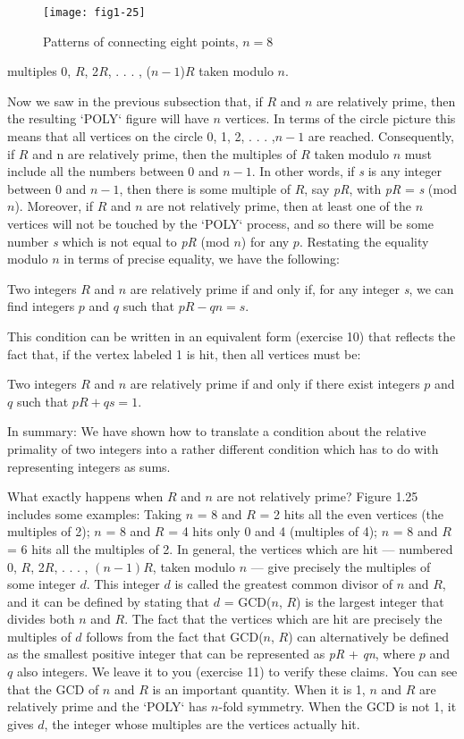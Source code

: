 \documentclass{book}
\begin{document}
\begin{figure}
\begin{center}
\texttt{[image: fig1-25]}
\caption{Patterns of connecting eight points, $n = 8$}
\end{center}
\end{figure}


multiples 0, $R$, 2$R$, . . . , ($n - 1$)$R$ taken modulo $n$.

Now we saw in the previous subsection that, if $R$ and $n$ are relatively
prime, then the resulting \textsc{`POLY`} figure will have $n$ vertices. In terms of the
circle picture this means that all vertices on the circle 0, 1, 2, . . . ,$n - 1$
are reached. Consequently, if $R$ and n are relatively prime, then the
multiples of $R$ taken modulo $n$ must include all the numbers between 0
and $n - 1$. In other words, if {\em s} is any integer between 0 and $n - 1$, then
there is some multiple of $R$, say {\em pR}, with {\em pR} = {\em s} (mod $n$). Moreover, if
$R$ and $n$ are not relatively prime, then at least one of the $n$ vertices will
not be touched by the \textsc{`POLY`} process, and so there will be some number
{\em s} which is not equal to {\em pR} (mod $n$) for any $p$. Restating the equality
modulo $n$ in terms of precise equality, we have the following: 

Two integers $R$ and $n$ are relatively prime if and only if, for any integer
{\em s}, we can find integers $p$ and $q$ such that $pR - qn = s$.

This condition can be written in an equivalent form (exercise 10) that
reflects the fact that, if the vertex labeled 1 is hit, then all vertices must
be:

Two integers $R$ and $n$ are relatively prime if and only if there exist
integers $p$ and $q$ such that $pR + qs = 1$.

In summary: We have shown how to translate a condition about the
relative primality of two integers into a rather different condition which
has to do with representing integers as sums.

What exactly happens when $R$ and $n$ are not relatively prime? Figure 
1.25 includes some examples: Taking $n$ = 8 and $R$ = 2 hits all the
even vertices (the multiples of 2); $n$ = 8 and $R$ = 4 hits only 0 and
4 (multiples of 4); $n$ = 8 and $R$ = 6 hits all the multiples of 2. In
general, the vertices which are hit --- numbered 0, $R$, 2$R$, . . . , $(n - 1)R$,
taken modulo $n$ --- give precisely the multiples of some integer $d$. This
integer $d$ is called the greatest common divisor of $n$ and $R$, and it can be
defined by stating that $d$ = GCD($n$, $R$) is the largest integer that divides
both $n$ and $R$. The fact that the vertices which are hit are precisely the
multiples of $d$ follows from the fact that GCD($n$, $R$) can alternatively
be defined as the smallest positive integer that can be represented as
{\em pR} + {\em qn}, where $p$ and $q$ also integers. We leave it to you (exercise 11)
to verify these claims. You can see that the GCD of $n$ and $R$ is an
important quantity. When it is 1, $n$ and $R$ are relatively prime and
the \textsc{`POLY`} has $n$-fold symmetry. When the GCD is not 1, it gives $d$, the
integer whose multiples are the vertices actually hit.
\end{document}
